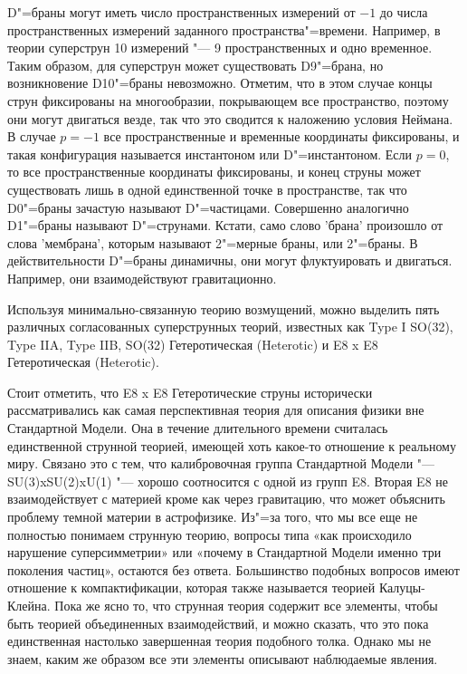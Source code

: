D"=браны могут иметь число пространственных измерений от $-1$ до числа пространственных измерений заданного пространства"=времени.
Например, в теории суперструн 10 измерений "--- 9 пространственных и одно временное.
Таким образом, для суперструн может существовать D9"=брана, но возникновение D10"=браны невозможно.
Отметим, что в этом случае концы струн фиксированы на многообразии,
покрывающем все пространство, поэтому они могут двигаться везде,
так что это сводится к наложению условия Неймана.
В случае $p = -1$ все пространственные и временные координаты фиксированы,
и такая конфигурация называется инстантоном или D"=инстантоном.
Если $p = 0$, то все пространственные координаты фиксированы,
и конец струны может существовать лишь в одной единственной точке в пространстве,
так что D0"=браны зачастую называют D"=частицами.
Совершенно аналогично D1"=браны называют D"=струнами.
Кстати, само слово 'брана' произошло от слова 'мембрана', которым называют 2"=мерные браны, или 2"=браны.
В действительности D"=браны динамичны, они могут флуктуировать и двигаться.
Например, они взаимодействуют гравитационно.

Используя минимально-связанную теорию возмущений, можно выделить пять различных согласованных суперструнных теорий, известных как Type I SO(32), Type IIA, Type IIB, SO(32) Гетеротическая (Heterotic) и E8 x E8 Гетеротическая (Heterotic).





Стоит отметить, что E8 x E8 Гетеротические струны исторически рассматривались как самая перспективная теория для описания физики вне Стандартной Модели.
Она в течение длительного времени считалась единственной струнной теорией, имеющей хоть какое-то отношение к реальному миру.
Связано это с тем, что калибровочная группа Стандартной Модели "--- SU(3)xSU(2)xU(1) "--- хорошо соотносится с одной из групп E8.
Вторая E8 не взаимодействует с материей кроме как через гравитацию, что может объяснить проблему темной материи в астрофизике.
Из"=за того, что мы все еще не полностью понимаем струнную теорию, вопросы типа «как происходило нарушение суперсимметрии» или «почему в Стандартной Модели именно три поколения частиц», остаются без ответа.
Большинство подобных вопросов имеют отношение к компактификации, которая также называется теорией Калуцы-Клейна.
Пока же ясно то, что струнная теория содержит все элементы, чтобы быть теорией объединенных взаимодействий,
и можно сказать, что это пока единственная настолько завершенная теория подобного толка.
Однако мы не знаем, каким же образом все эти элементы описывают наблюдаемые явления. 

